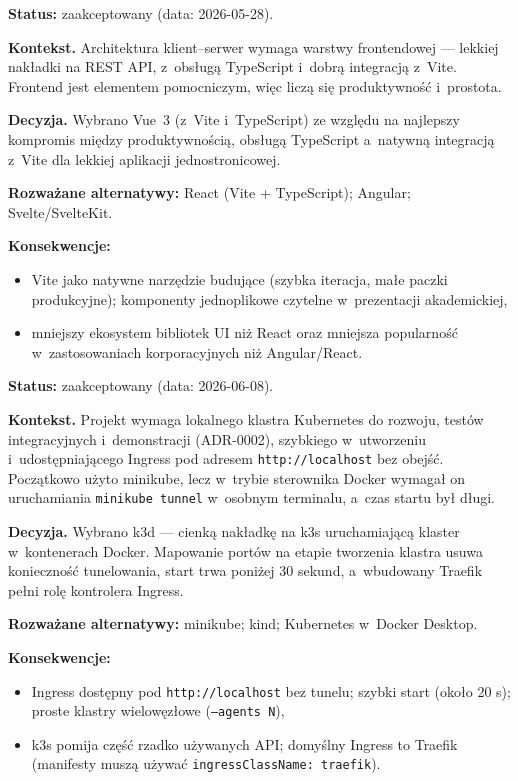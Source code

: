 
\textbf{Status:} zaakceptowany (data: 2026-05-28).

\textbf{Kontekst.} Architektura klient--serwer wymaga warstwy frontendowej --- lekkiej nakładki na REST API, z~obsługą TypeScript i~dobrą integracją z~Vite. Frontend jest elementem pomocniczym, więc liczą się produktywność i~prostota.

\textbf{Decyzja.} Wybrano Vue~3 (z~Vite i~TypeScript) ze względu na najlepszy kompromis między produktywnością, obsługą TypeScript a~natywną integracją z~Vite dla lekkiej aplikacji jednostronicowej.

\textbf{Rozważane alternatywy:} React (Vite + TypeScript); Angular; Svelte/SvelteKit.

\textbf{Konsekwencje:}
\begin{itemize}
  \item[$+$] Vite jako natywne narzędzie budujące (szybka iteracja, małe paczki produkcyjne); komponenty jednoplikowe czytelne w~prezentacji akademickiej,
  \item[$-$] mniejszy ekosystem bibliotek UI niż React oraz mniejsza popularność w~zastosowaniach korporacyjnych niż Angular/React.
\end{itemize}


\textbf{Status:} zaakceptowany (data: 2026-06-08).

\textbf{Kontekst.} Projekt wymaga lokalnego klastra Kubernetes do rozwoju, testów integracyjnych i~demonstracji (ADR-0002), szybkiego w~utworzeniu i~udostępniającego Ingress pod adresem \texttt{http://localhost} bez obejść. Początkowo użyto minikube, lecz w~trybie sterownika Docker wymagał on uruchamiania \texttt{minikube tunnel} w~osobnym terminalu, a~czas startu był długi.

\textbf{Decyzja.} Wybrano k3d --- cienką nakładkę na k3s uruchamiającą klaster w~kontenerach Docker. Mapowanie portów na etapie tworzenia klastra usuwa konieczność tunelowania, start trwa poniżej 30 sekund, a~wbudowany Traefik pełni rolę kontrolera Ingress.

\textbf{Rozważane alternatywy:} minikube; kind; Kubernetes w~Docker Desktop.

\textbf{Konsekwencje:}
\begin{itemize}
  \item[$+$] Ingress dostępny pod \texttt{http://localhost} bez tunelu; szybki start (około 20 s); proste klastry wielowęzłowe (\texttt{--agents N}),
  \item[$-$] k3s pomija część rzadko używanych API; domyślny Ingress to Traefik (manifesty muszą używać \texttt{ingressClassName: traefik}).
\end{itemize}

